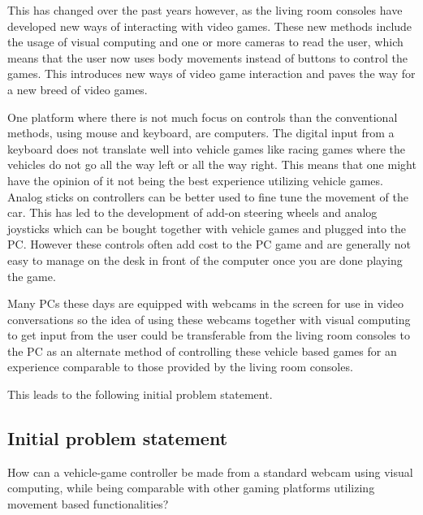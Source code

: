 This has changed over the past years however, as the living room consoles have developed new ways of interacting with video games. These new methods include the usage of visual computing and one or more cameras to read the user, which means that the user now uses body movements instead of buttons to control the games. This introduces new ways of video game interaction and paves the way for a new breed of video games.
\bigskip

One platform where there is not much focus on controls than the conventional methods, using mouse and keyboard, are computers. The digital input from a keyboard does not translate well into vehicle games like racing games where the vehicles do not go all the way left or all the way right. This means that one might have the opinion of it not being the best experience utilizing vehicle games. Analog sticks on controllers can be better used to fine tune the movement of the car. This has led to the development of add-on steering wheels and analog joysticks which can be bought together with vehicle games and plugged into the PC. However these controls often add cost to the PC game and are generally not easy to manage on the desk in front of the computer once you are done playing the game.
\bigskip

Many PCs these days are equipped with webcams in the screen for use in video conversations so the idea of using these webcams together with visual computing to get input from the user could be transferable from the living room consoles to the PC as an alternate method of controlling these vehicle based games for an experience comparable to those provided by the living room consoles.

\noindent This leads to the following initial problem statement.

\subsection{Initial problem statement}
How can a vehicle-game controller be made from a standard webcam using visual computing, while being comparable with other gaming platforms utilizing movement based functionalities?